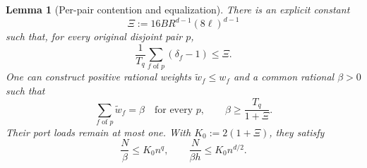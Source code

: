 \documentclass[letterpaper,11pt]{article}
\newtheorem{lemma}[theorem]{Lemma}
\theoremstyle{definition}
\begin{document}
\begin{lemma}[Per-pair contention and equalization]\label{odd:lem:equalize}
There is an explicit constant
\[
 \Xi:=16BR^{d-1}(8\ell)^{d-1}
\]
such that, for every original disjoint pair $p$,
\begin{equation}\label{odd:eq:pair-contention}
 \frac1{T_q}\sum_{f\text{ of }p}(\delta_f-1)\leq\Xi.
\end{equation}
One can construct positive rational weights $\widetilde w_f\leq w_f$
and a common rational $\beta>0$ such that
\begin{equation}\label{odd:eq:equal-pair-mass}
 \sum_{f\text{ of }p}\widetilde w_f=\beta
 \quad\text{for every }p,\qquad
 \beta\geq\frac{T_q}{1+\Xi}.
\end{equation}
Their port loads remain at most one.  With $K_0:=2(1+\Xi)$, they satisfy
\begin{equation}\label{odd:eq:beta-estimate}
 \frac N\beta\leq K_0n^q,\qquad
 \frac{N}{\beta h}\leq K_0n^{d/2}.
\end{equation}
\end{lemma}
\end{document}
